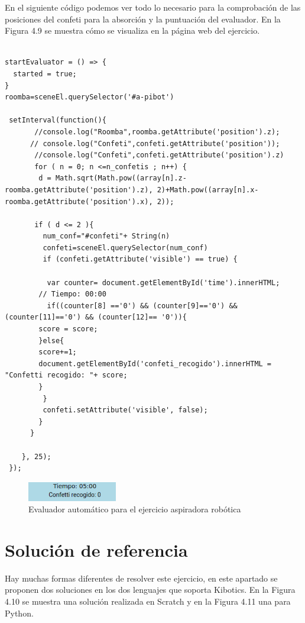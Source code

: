 En el siguiente código podemos ver todo lo necesario para la comprobación de las posiciones del confeti para la absorción y  la puntuación del evaluador. En la Figura 4.9 se muestra cómo se visualiza en la página web del ejercicio.

\begin{lstlisting}

startEvaluator = () => {
  started = true;
}
roomba=sceneEl.querySelector('#a-pibot')

 setInterval(function(){
       //console.log("Roomba",roomba.getAttribute('position').z);
      // console.log("Confeti",confeti.getAttribute('position'));
       //console.log("Confeti",confeti.getAttribute('position').z)
       for ( n = 0; n <=n_confetis ; n++) {
        d = Math.sqrt(Math.pow((array[n].z-roomba.getAttribute('position').z), 2)+Math.pow((array[n].x-roomba.getAttribute('position').x), 2));

       if ( d <= 2 ){
         num_conf="#confeti"+ String(n)
         confeti=sceneEl.querySelector(num_conf)
         if (confeti.getAttribute('visible') == true) {
	      
	      var counter= document.getElementById('time').innerHTML;
		// Tiempo: 00:00	
	      if((counter[8] =='0') && (counter[9]=='0') && (counter[11]=='0') && (counter[12]== '0')){      
		score = score;
		}else{
		score+=1;
		document.getElementById('confeti_recogido').innerHTML = "Confetti recogido: "+ score;
		}
         }
         confeti.setAttribute('visible', false);
        }
      }
	
    }, 25);
 });
\end{lstlisting}

 \begin{figure}[H]
  \centering
 \includegraphics[width=0.35\textwidth]{chapters/images/evaluadoraspiradora.png}
  \caption{Evaluador automático para el ejercicio aspiradora robótica}
\end{figure}
\section{Solución de referencia}

Hay muchas formas diferentes  de resolver este ejercicio, en este apartado se proponen dos soluciones en los dos lenguajes que soporta Kibotics. En la Figura 4.10 se muestra una solución realizada en Scratch y en la Figura 4.11 una para Python.

